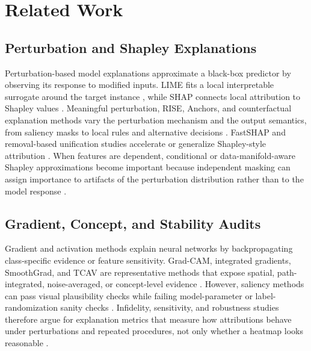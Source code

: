 \documentclass[10pt,conference,letterpaper]{IEEEtran}
\begin{document}
\section{Related Work}

\subsection{Perturbation and Shapley Explanations}
Perturbation-based model explanations approximate a black-box predictor by observing its response to modified inputs.  LIME fits a local interpretable surrogate around the target instance \cite{ribeiro2016lime}, while SHAP connects local attribution to Shapley values \cite{lundberg2017shap}.  Meaningful perturbation, RISE, Anchors, and counterfactual explanation methods vary the perturbation mechanism and the output semantics, from saliency masks to local rules and alternative decisions \cite{fong2017meaningful,petsiuk2018rise,ribeiro2018anchors,wachter2017counterfactual,mothilal2020dice}.  FastSHAP and removal-based unification studies accelerate or generalize Shapley-style attribution \cite{jethani2021fastshap,covert2021remove}.  When features are dependent, conditional or data-manifold-aware Shapley approximations become important because independent masking can assign importance to artifacts of the perturbation distribution rather than to the model response \cite{aas2021dependent}.

\subsection{Gradient, Concept, and Stability Audits}
Gradient and activation methods explain neural networks by backpropagating class-specific evidence or feature sensitivity.  Grad-CAM, integrated gradients, SmoothGrad, and TCAV are representative methods that expose spatial, path-integrated, noise-averaged, or concept-level evidence \cite{selvaraju2017gradcam,sundararajan2017ig,smilkov2017smoothgrad,kim2018tcav}.  However, saliency methods can pass visual plausibility checks while failing model-parameter or label-randomization sanity checks \cite{adebayo2018sanity}.  Infidelity, sensitivity, and robustness studies therefore argue for explanation metrics that measure how attributions behave under perturbations and repeated procedures, not only whether a heatmap looks reasonable \cite{yeh2019infidelity,alvarez2018robustness}.
\end{document}
